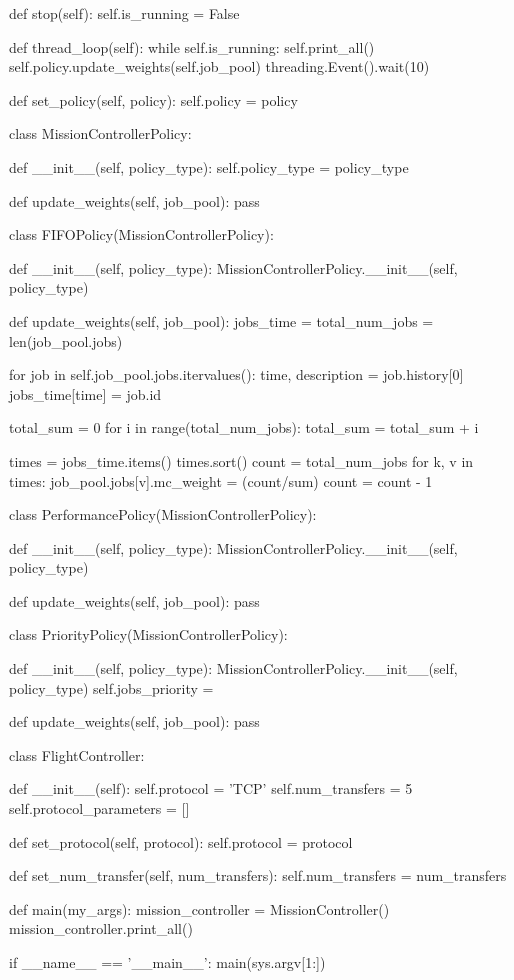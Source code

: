     def stop(self):
        self.is_running = False
        
    def thread_loop(self):
        while self.is_running:
            self.print_all()
            self.policy.update_weights(self.job_pool)
            threading.Event().wait(10)
    
    def set_policy(self, policy):
        self.policy = policy
            
class MissionControllerPolicy:

    def __init__(self, policy_type):
        self.policy_type = policy_type
    
    def update_weights(self, job_pool):
        pass

class FIFOPolicy(MissionControllerPolicy):
    
    def __init__(self, policy_type):
        MissionControllerPolicy.__init__(self, policy_type)
    
    def update_weights(self, job_pool):
        jobs_time = {}
        total_num_jobs = len(job_pool.jobs)

        for job in self.job_pool.jobs.itervalues():
            time, description = job.history[0]
            jobs_time[time] = job.id
        
        total_sum = 0
        for i in range(total_num_jobs):
            total_sum = total_sum + i

        times = jobs_time.items()
        times.sort()
        count = total_num_jobs
        for k, v in times:
            job_pool.jobs[v].mc_weight = (count/sum)
            count = count - 1
            
class PerformancePolicy(MissionControllerPolicy):
    
    def __init__(self, policy_type):
        MissionControllerPolicy.__init__(self, policy_type)
    
    def update_weights(self, job_pool):   
        pass
    
class PriorityPolicy(MissionControllerPolicy):
    
    def __init__(self, policy_type):
        MissionControllerPolicy.__init__(self, policy_type)
        self.jobs_priority = {}
    
    def update_weights(self, job_pool):   
        pass
    
class FlightController:
    
    def __init__(self):
        self.protocol = 'TCP'
        self.num_transfers = 5
        self.protocol_parameters = []
    
    def set_protocol(self, protocol):
        self.protocol = protocol
        
    def set_num_transfer(self, num_transfers):
        self.num_transfers = num_transfers
        
def main(my_args):
    mission_controller = MissionController()
    mission_controller.print_all()
     
if __name__ == '__main__':
    main(sys.argv[1:])   